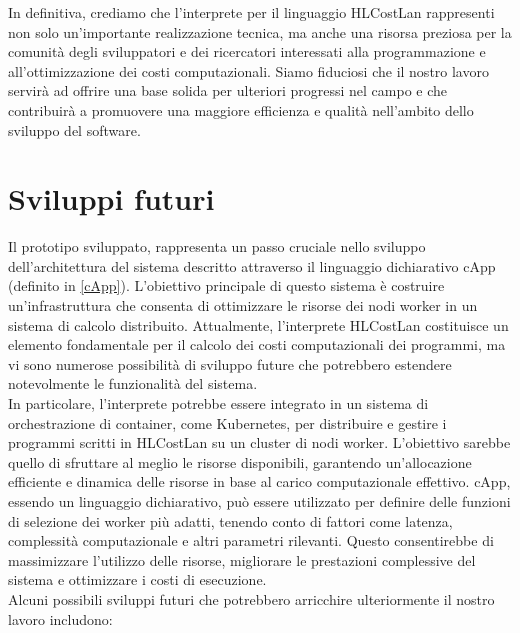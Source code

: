 \documentclass[../../main.tex]{subfiles}
\begin{document}
In definitiva, crediamo che l'interprete per il linguaggio HLCostLan rappresenti non solo un'importante realizzazione tecnica, ma anche una risorsa preziosa per la comunità degli sviluppatori e dei ricercatori interessati alla programmazione e all'ottimizzazione dei costi computazionali. Siamo fiduciosi che il nostro lavoro servirà ad offrire una base solida per ulteriori progressi nel campo e che contribuirà a promuovere una maggiore efficienza e qualità nell'ambito dello sviluppo del software.

\section{Sviluppi futuri}
Il prototipo sviluppato, rappresenta un passo cruciale nello sviluppo dell'architettura del sistema descritto attraverso il linguaggio dichiarativo cApp (definito in \ref{cApp}). L'obiettivo principale di questo sistema è costruire un'infrastruttura che consenta di ottimizzare le risorse dei nodi worker in un sistema di calcolo distribuito. Attualmente, l'interprete HLCostLan costituisce un elemento fondamentale per il calcolo dei costi computazionali dei programmi, ma vi sono numerose possibilità di sviluppo future che potrebbero estendere notevolmente le funzionalità del sistema.\\
In particolare, l'interprete potrebbe essere integrato in un sistema di orchestrazione di container, come Kubernetes, per distribuire e gestire i programmi scritti in HLCostLan su un cluster di nodi worker. L'obiettivo sarebbe quello di sfruttare al meglio le risorse disponibili, garantendo un'allocazione efficiente e dinamica delle risorse in base al carico computazionale effettivo. cApp, essendo un linguaggio dichiarativo, può essere utilizzato per definire delle funzioni di selezione dei worker più adatti, tenendo conto di fattori come latenza, complessità computazionale e altri parametri rilevanti. Questo consentirebbe di massimizzare l'utilizzo delle risorse, migliorare le prestazioni complessive del sistema e ottimizzare i costi di esecuzione.\\
Alcuni possibili sviluppi futuri che potrebbero arricchire ulteriormente il nostro lavoro includono:
\end{document}
